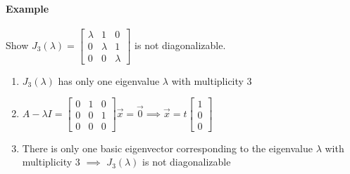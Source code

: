 \paragraph*{Example}
Show $J_3(\lambda) = \begin{bmatrix}
    \lambda & 1 & 0 \\
    0 & \lambda & 1 \\
    0 & 0 & \lambda
\end{bmatrix}$ is not diagonalizable.
\begin{enumerate}
    \item $J_3(\lambda)$ has only one eigenvalue $\lambda$ with multiplicity 3
    \item $A - \lambda I = \begin{bmatrix}
    0 & 1 & 0 \\
    0 & 0 & 1 \\
    0 & 0 & 0
\end{bmatrix} \vec{x} = \vec{0} \implies \vec{x} = t \begin{bmatrix}
    1 \\
    0 \\
    0
\end{bmatrix}$
    \item There is only one basic eigenvector corresponding to the eigenvalue $\lambda$ with multiplicity 3 $\implies$ $J_3(\lambda)$ is not diagonalizable
\end{enumerate}